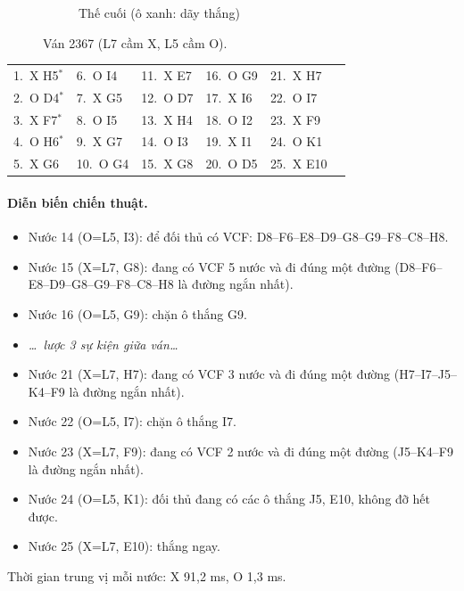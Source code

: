 \begin{figure}[H]
\begin{subfigure}[t]{.48\linewidth}
    \caption{Thế cuối (ô xanh: dãy thắng)}
  \end{subfigure}
  \caption{Ván 2367 (L7 cầm X, L5 cầm O).}
  \label{fig:cs-van-24}
\end{figure}
{\footnotesize\linespread{1}\selectfont
\noindent\begin{tabularx}{\linewidth}{*{6}{X}}
\toprule
1.~X H5$^\ast$ & 6.~O I4 & 11.~X E7 & 16.~O G9 & 21.~X H7 &  \\
2.~O D4$^\ast$ & 7.~X G5 & 12.~O D7 & 17.~X I6 & 22.~O I7 &  \\
3.~X F7$^\ast$ & 8.~O I5 & 13.~X H4 & 18.~O I2 & 23.~X F9 &  \\
4.~O H6$^\ast$ & 9.~X G7 & 14.~O I3 & 19.~X I1 & 24.~O K1 &  \\
5.~X G6 & 10.~O G4 & 15.~X G8 & 20.~O D5 & 25.~X E10 &  \\
\bottomrule
\end{tabularx}\par}
\paragraph{Diễn biến chiến thuật.}
\begin{itemize}\footnotesize\linespread{1.1}\selectfont
\setlength{\itemsep}{0pt}
  \item Nước 14 (O=L5, I3): để đối thủ có VCF: D8--F6--E8--D9--G8--G9--F8--C8--H8.
  \item Nước 15 (X=L7, G8): đang có VCF 5 nước và đi đúng một đường (D8--F6--E8--D9--G8--G9--F8--C8--H8 là đường ngắn nhất).
  \item Nước 16 (O=L5, G9): chặn ô thắng G9.
  \item[] \emph{\dots\ lược 3 sự kiện giữa ván\dots}
  \item Nước 21 (X=L7, H7): đang có VCF 3 nước và đi đúng một đường (H7--I7--J5--K4--F9 là đường ngắn nhất).
  \item Nước 22 (O=L5, I7): chặn ô thắng I7.
  \item Nước 23 (X=L7, F9): đang có VCF 2 nước và đi đúng một đường (J5--K4--F9 là đường ngắn nhất).
  \item Nước 24 (O=L5, K1): đối thủ đang có các ô thắng J5, E10, không đỡ hết được.
  \item Nước 25 (X=L7, E10): thắng ngay.
\end{itemize}
Thời gian trung vị mỗi nước: X 91,2 ms, O 1,3 ms.
\clearpage

